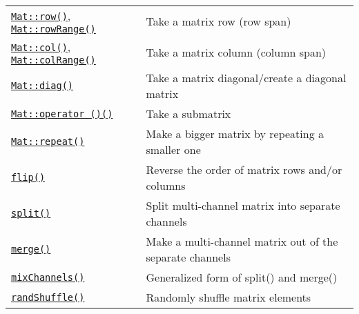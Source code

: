 \documentclass[10pt,landscape]{article}
\begin{document}
\begin{multicols}{3}
\begin{tabular}{@{}p{\the\MyLen}%
                @{}p{\linewidth-\the\MyLen}@{}}
\texttt{\href{http://opencv.willowgarage.com/documentation/cpp/basic_structures.html\#Mat::row}{Mat::row()}}, \texttt{\href{http://opencv.willowgarage.com/documentation/cpp/basic_structures.html\#Mat::rowRange}{Mat::rowRange()}} & Take a matrix row (row span) \\

\texttt{\href{http://opencv.willowgarage.com/documentation/cpp/basic_structures.html\#Mat::col}{Mat::col()}}, \texttt{\href{http://opencv.willowgarage.com/documentation/cpp/basic_structures.html\#Mat::colRange}{Mat::colRange()}} & Take a matrix column (column span) \\

\texttt{\href{http://opencv.willowgarage.com/documentation/cpp/basic_structures.html\#Mat::diag}{Mat::diag()}} & Take a matrix diagonal/create a diagonal matrix \\

\texttt{\href{http://opencv.willowgarage.com/documentation/cpp/basic_structures.html\#index-1245}{Mat::operator ()()}} & Take a submatrix \\

\texttt{\href{http://opencv.willowgarage.com/documentation/cpp/basic_structures.html\#Mat::repeat}{Mat::repeat()}} & Make a bigger matrix by repeating a smaller one \\

\texttt{\href{http://opencv.willowgarage.com/documentation/cpp/operations_on_arrays.html\#cv-flip}{flip()}} & Reverse the order of matrix rows and/or columns \\

\texttt{\href{http://opencv.willowgarage.com/documentation/cpp/operations_on_arrays.html\#cv-split}{split()}} & Split multi-channel matrix into separate channels \\

\texttt{\href{http://opencv.willowgarage.com/documentation/cpp/operations_on_arrays.html\#cv-merge}{merge()}} & Make a multi-channel matrix out of the separate channels \\

\texttt{\href{http://opencv.willowgarage.com/documentation/cpp/operations_on_arrays.html\#cv-mixchannels}{mixChannels()}} & Generalized form of split() and merge() \\

\texttt{\href{http://opencv.willowgarage.com/documentation/cpp/operations_on_arrays.html\#cv-randshuffle}{randShuffle()}} & Randomly shuffle matrix elements \\


\end{tabular}
\end{multicols}
\end{document}
